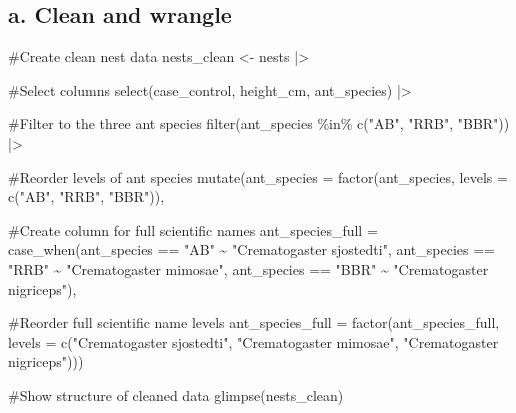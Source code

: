 \documentclass[
  letterpaper,
  DIV=11,
  numbers=noendperiod]{scrartcl}
\newenvironment{Shaded}{\begin{snugshade}}{\end{snugshade}}
\newcommand{\AttributeTok}[1]{\textcolor[rgb]{0.40,0.45,0.13}{#1}}
\newcommand{\CommentTok}[1]{\textcolor[rgb]{0.37,0.37,0.37}{#1}}
\newcommand{\FunctionTok}[1]{\textcolor[rgb]{0.28,0.35,0.67}{#1}}
\newcommand{\NormalTok}[1]{\textcolor[rgb]{0.00,0.23,0.31}{#1}}
\newcommand{\OtherTok}[1]{\textcolor[rgb]{0.00,0.23,0.31}{#1}}
\newcommand{\SpecialCharTok}[1]{\textcolor[rgb]{0.37,0.37,0.37}{#1}}
\newcommand{\StringTok}[1]{\textcolor[rgb]{0.13,0.47,0.30}{#1}}
\begin{document}
\subsection{\texorpdfstring{\textbf{a. Clean and
wrangle}}{a. Clean and wrangle}}\label{a.-clean-and-wrangle}

\begin{Shaded}
\begin{Highlighting}[]
\CommentTok{\#Create clean nest data}
\NormalTok{nests\_clean }\OtherTok{\textless{}{-}}\NormalTok{ nests }\SpecialCharTok{|\textgreater{}}
  
  \CommentTok{\#Select columns}
  \FunctionTok{select}\NormalTok{(case\_control,}
\NormalTok{         height\_cm,}
\NormalTok{         ant\_species) }\SpecialCharTok{|\textgreater{}}
  
  \CommentTok{\#Filter to the three ant species}
  \FunctionTok{filter}\NormalTok{(ant\_species }\SpecialCharTok{\%in\%} \FunctionTok{c}\NormalTok{(}\StringTok{"AB"}\NormalTok{, }
                            \StringTok{"RRB"}\NormalTok{, }
                            \StringTok{"BBR"}\NormalTok{)) }\SpecialCharTok{|\textgreater{}}
  
  \CommentTok{\#Reorder levels of ant species}
  \FunctionTok{mutate}\NormalTok{(}\AttributeTok{ant\_species =} \FunctionTok{factor}\NormalTok{(ant\_species,}
                              \AttributeTok{levels =} \FunctionTok{c}\NormalTok{(}\StringTok{"AB"}\NormalTok{, }
                                         \StringTok{"RRB"}\NormalTok{, }
                                         \StringTok{"BBR"}\NormalTok{)),}
         
         \CommentTok{\#Create column for full scientific names}
         \AttributeTok{ant\_species\_full =} \FunctionTok{case\_when}\NormalTok{(ant\_species }\SpecialCharTok{==} \StringTok{"AB"} \SpecialCharTok{\textasciitilde{}} \StringTok{"Crematogaster sjostedti"}\NormalTok{,}
\NormalTok{                                      ant\_species }\SpecialCharTok{==} \StringTok{"RRB"} \SpecialCharTok{\textasciitilde{}} \StringTok{"Crematogaster mimosae"}\NormalTok{,}
\NormalTok{                                      ant\_species }\SpecialCharTok{==} \StringTok{"BBR"} \SpecialCharTok{\textasciitilde{}} \StringTok{"Crematogaster nigriceps"}\NormalTok{),}
         
         \CommentTok{\#Reorder full scientific name levels}
         \AttributeTok{ant\_species\_full =} \FunctionTok{factor}\NormalTok{(ant\_species\_full,}
                                   \AttributeTok{levels =} \FunctionTok{c}\NormalTok{(}\StringTok{"Crematogaster sjostedti"}\NormalTok{,}
                                              \StringTok{"Crematogaster mimosae"}\NormalTok{,}
                                              \StringTok{"Crematogaster nigriceps"}\NormalTok{)))}

\CommentTok{\#Show structure of cleaned data}
\FunctionTok{glimpse}\NormalTok{(nests\_clean)}
\end{Highlighting}
\end{Shaded}
\end{document}
